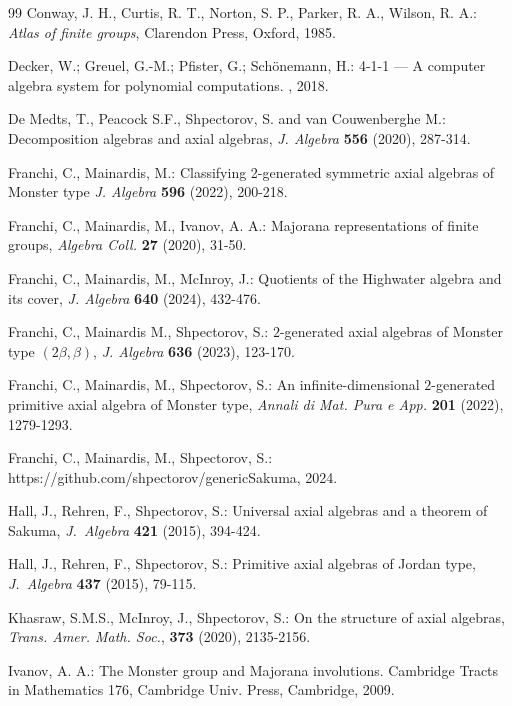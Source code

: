 \documentclass[a4paper]{amsart}
\newcommand{\bt}{\beta}
\begin{document}
\begin{thebibliography}{99}
 Conway, J. H., Curtis, R. T., Norton, S. P., Parker, R. A., Wilson, R. A.: {\it Atlas of finite groups}, Clarendon Press, Oxford, 1985.

Decker, W.; Greuel, G.-M.; Pfister, G.; Sch{\"o}nemann, H.: 
 {4-1-1} --- {A} computer algebra system for polynomial computations.
, 2018.

 De Medts, T., Peacock S.F., Shpectorov, S. and van Couwenberghe M.: Decomposition algebras and axial algebras, {\it J. Algebra} {\bf 556} (2020), 287-314.

 Franchi, C., Mainardis, M.: Classifying 2-generated symmetric axial algebras of Monster type  {\it J. Algebra} {\bf 596} (2022), 200-218.

 Franchi, C., Mainardis, M., Ivanov, A. A.: Majorana representations of finite groups, {\it Algebra Coll.} {\bf 27} (2020), 31-50.

 Franchi, C., Mainardis, M., McInroy, J.: Quotients of the Highwater algebra and its cover, {\it J. Algebra} {\bf 640} (2024), 432-476.

 Franchi, C., Mainardis M., Shpectorov, S.: $2$-generated axial algebras of Monster type $(2\bt, \bt)$, {\it J. Algebra} {\bf 636} (2023), 123-170. 

 Franchi, C., Mainardis, M., Shpectorov, S.: An infinite-dimensional $2$-generated primitive axial algebra of Monster type, {\it Annali di Mat. Pura e App.} {\bf 201} (2022), 1279-1293. %

 Franchi, C., Mainardis, M., Shpectorov, S.: https://github.com/shpectorov/generic\textunderscore Sakuma, 2024.

 Hall, J., Rehren, F., Shpectorov, S.: Universal axial algebras and a theorem 
of Sakuma, {\it J.~Algebra} {\bf 421} (2015), 394-424.

 Hall, J., Rehren, F., Shpectorov, S.: Primitive axial algebras of Jordan type, {\it J.~Algebra} {\bf 437} (2015), 79-115.

 Khasraw, S.M.S., McInroy, J., Shpectorov, S.: On the structure of axial algebras,  {\it Trans. Amer. Math. Soc.}, {\bf 373} (2020), 2135-2156.

 Ivanov, A. A.: The Monster group and Majorana involutions. Cambridge Tracts in Mathematics 176, Cambridge Univ. Press, Cambridge, 2009.


\end{thebibliography}
\end{document}

